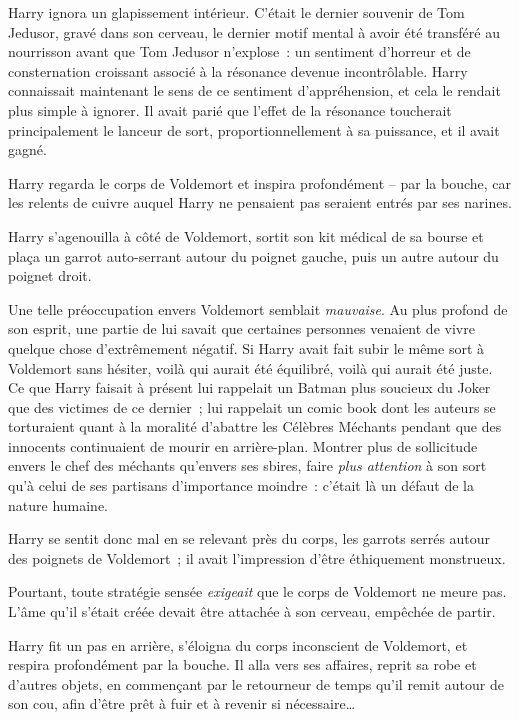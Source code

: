 Harry ignora un glapissement intérieur.
C'était le dernier souvenir de Tom Jedusor, gravé dans son cerveau, le dernier motif mental à avoir été transféré au nourrisson avant que Tom Jedusor n'explose~: un sentiment d'horreur et de consternation croissant associé à la résonance devenue incontrôlable.
Harry connaissait maintenant le sens de ce sentiment d'appréhension, et cela le rendait plus simple à ignorer.
Il avait parié que l'effet de la résonance toucherait principalement le lanceur de sort, proportionnellement à sa puissance, et il avait gagné.

Harry regarda le corps de Voldemort et inspira profondément -- par la bouche, car les relents de cuivre auquel Harry ne pensaient pas seraient entrés par ses narines.

Harry s'agenouilla à côté de Voldemort, sortit son kit médical de sa bourse et plaça un garrot auto-serrant autour du poignet gauche, puis un autre autour du poignet droit.

Une telle préoccupation envers Voldemort semblait \emph{mauvaise}.
Au plus profond de son esprit, une partie de lui savait que certaines personnes venaient de vivre quelque chose d'extrêmement négatif.
Si Harry avait fait subir le même sort à Voldemort sans hésiter, voilà qui aurait été équilibré, voilà qui aurait été juste.
Ce que Harry faisait à présent lui rappelait un Batman plus soucieux du Joker que des victimes de ce dernier~; lui rappelait un comic book dont les auteurs se torturaient quant à la moralité d'abattre les Célèbres Méchants pendant que des innocents continuaient de mourir en arrière-plan.
Montrer plus de sollicitude envers le chef des méchants qu'envers ses sbires, faire \emph{plus attention} à son sort qu'à celui de ses partisans d'importance moindre~: c'était là un défaut de la nature humaine.

Harry se sentit donc mal en se relevant près du corps, les garrots serrés autour des poignets de Voldemort~; il avait l'impression d'être éthiquement monstrueux.

Pourtant, toute stratégie sensée \emph{exigeait} que le corps de Voldemort ne meure pas.
L'âme qu'il s'était créée devait être attachée à son cerveau, empêchée de partir.

Harry fit un pas en arrière, s'éloigna du corps inconscient de Voldemort, et respira profondément par la bouche.
Il alla vers ses affaires, reprit sa robe et d'autres objets, en commençant par le retourneur de temps qu'il remit autour de son cou, afin d'être prêt à fuir et à revenir si nécessaire…

